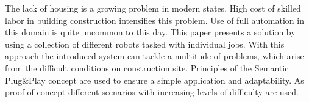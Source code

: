 The lack of housing is a growing problem in modern states. 
High cost of skilled labor in building construction intensifies this problem.
Use of full automation in this domain is quite uncommon to this day.
This paper presents a solution by using a collection of different robots tasked with individual jobs.
With this approach the introduced system can tackle a multitude of problems, which arise from the difficult conditions on construction site.
Principles of the Semantic Plug\&{}Play concept are used to ensure a simple application and adaptability.
As proof of concept different scenarios with increasing levels of difficulty are used.